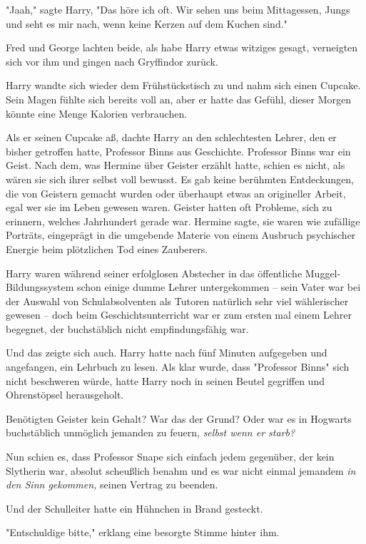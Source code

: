{"Jaah," sagte Harry, "Das höre ich oft. Wir sehen uns beim Mittagessen, Jungs und seht es mir nach, wenn keine Kerzen auf dem Kuchen sind."

Fred und George lachten beide, als habe Harry etwas witziges gesagt, verneigten sich vor ihm und gingen nach Gryffindor zurück.

Harry wandte sich wieder dem Frühstückstisch zu und nahm sich einen Cupcake. Sein Magen fühlte sich bereits voll an, aber er hatte das Gefühl, dieser Morgen könnte eine Menge Kalorien verbrauchen.

Als er seinen Cupcake aß, dachte Harry an den schlechtesten Lehrer, den er bisher getroffen hatte, Professor Binns aus Geschichte. Professor Binns war ein Geist. Nach dem, was Hermine über Geister erzählt hatte, schien es nicht, als wären sie sich ihrer selbst voll bewusst. Es gab keine berühmten Entdeckungen, die von Geistern gemacht wurden oder überhaupt etwas an origineller Arbeit, egal wer sie im Leben gewesen waren. Geister hatten oft Probleme, sich zu erinnern, welches Jahrhundert gerade war. Hermine sagte, sie waren wie zufällige Porträts, eingeprägt in die umgebende Materie von einem Ausbruch psychischer Energie beim plötzlichen Tod eines Zauberers.

Harry waren während seiner erfolglosen Abstecher in das öffentliche Muggel-Bildungssystem schon einige dumme Lehrer untergekommen -- sein Vater war bei der Auswahl von Schulabsolventen als Tutoren natürlich sehr viel wählerischer gewesen -- doch beim Geschichtsunterricht war er zum ersten mal einem Lehrer begegnet, der buchstäblich nicht empfindungsfähig war.

Und das zeigte sich auch. Harry hatte nach fünf Minuten aufgegeben und angefangen, ein Lehrbuch zu lesen. Als klar wurde, dass "Professor Binns" sich nicht beschweren würde, hatte Harry noch in seinen Beutel gegriffen und Ohrenstöpsel herausgeholt.

Benötigten Geister kein Gehalt? War das der Grund? Oder war es in Hogwarts buchstäblich unmöglich jemanden zu feuern, \emph{selbst wenn er starb?}

Nun schien es, dass Professor Snape sich einfach jedem gegenüber, der kein Slytherin war, absolut scheußlich benahm und es war nicht einmal jemandem \emph{in den Sinn gekommen,} seinen Vertrag zu beenden.

Und der Schulleiter hatte ein Hühnchen in Brand gesteckt.

"Entschuldige bitte," erklang eine besorgte Stimme hinter ihm.

}
